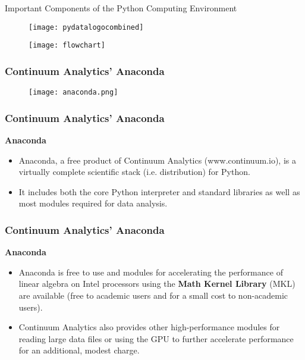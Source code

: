 \documentclass[MASTER.tex]{subfiles}
\begin{document}
 
\begin{frame}
\huge
Important Components of the Python Computing Environment
\end{frame}
\begin{frame}
	\begin{figure}
		\centering
		\texttt{[image: pydatalogocombined]}
	\end{figure}
	
\end{frame}
\begin{frame}
	\begin{figure}
\centering
\texttt{[image: flowchart]}

\end{figure}

\end{frame}
\begin{frame}
	\frametitle{Continuum Analytics’ Anaconda}
	\begin{figure}
\centering
\texttt{[image: anaconda.png]}

\end{figure}

\end{frame}
\begin{frame}
\frametitle{Continuum Analytics’ Anaconda}
\Large
\textbf{Anaconda}
\begin{itemize}
\item Anaconda, a free product of Continuum Analytics (www.continuum.io), is a virtually complete scientific
stack (i.e. distribution) for Python. 
\item It includes both the core Python interpreter and standard libraries as well as most
modules required for data analysis. 

\end{itemize}
\end{frame}
\begin{frame}
\frametitle{Continuum Analytics’ Anaconda}
\Large
\textbf{Anaconda}
	\begin{itemize}
\item Anaconda is free to use and modules for accelerating the performance
of linear algebra on Intel processors using the \textbf{Math Kernel Library} (MKL) are available (free to
academic users and for a small cost to non-academic users). 
\item Continuum Analytics also provides other
high-performance modules for reading large data files or using the GPU to further accelerate performance
for an additional, modest charge. 
	\end{itemize}

\end{frame}
\end{document}
